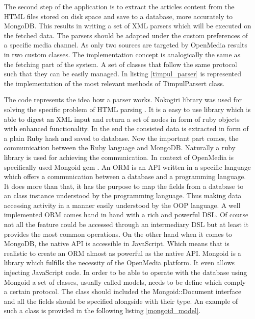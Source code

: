 The second step of the application is to extract the articles content from the HTML files stored on disk space and save to a database, more accurately to MongoDB. This results in writing a set of XML parsers which will be executed on the fetched data. The parsers should be adapted under the custom preferences of a specific media channel. As only two sources are targeted by OpenMedia results in two custom classes. The implementation concept is analogically the same as the fetching part of the system. A set of classes that follow the same protocol such that they can be easily managed. In listing \ref{timpul_parser} is represented the implementation of the most relevant methods of TimpulParsert class.



The code represents the idea how a parser works. Nokogiri library was used for solving the specific problem of HTML parsing \cite{nokogiri_gem}. It is a easy to use library which is able to digest an XML input and return a set of nodes in form of ruby objects with enhanced functionality. In the end the consisted data is extracted in form of a plain Ruby hash and saved to database. Now the important part comes, the communication between the Ruby language and MongoDB. Naturally a ruby library is used for achieving the communication. In context of OpenMedia is specifically used Mongoid gem \cite{mongoid_gem}. An ORM is an API written in a specific language which offers a communication between a database and a programming language. It does more than that, it has the purpose to map the fields from a database to an class instance understood by the programming language. Thus making data accessing activity in a manner easily understood by the OOP language. A well implemented ORM comes hand in hand with a rich and powerful DSL. Of course not all the feature could be accessed through an intermediary DSL but at least it provides the most common operations. On the other hand when it comes to MongoDB, the native API is accessible in JavaScript. Which means that is realistic to create an ORM almost as powerful as the native API. Mongoid is a library which fulfills the necessity of the OpenMedia platform. It even allows injecting JavaScript code. In order to be able to operate with the database using Mongoid a set of classes, usually called models, needs to be define which comply a certain protocol. The class should included the Mongoid::Document interface and all the fields should be specified alongside with their type. An example of such a class is provided in the following listing \ref{mongoid_model}.

